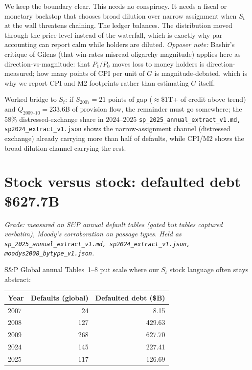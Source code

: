We keep the boundary clear. This needs no conspiracy. It needs a fiscal or monetary backstop that chooses broad dilution over narrow assignment when $S_t$ at the wall threatens chaining. The ledger balances. The distribution moved through the price level instead of the waterfall, which is exactly why par accounting can report calm while holders are diluted. \textit{Opposer note:} Bashir's critique of Gilens (that win-rates misread oligarchy magnitude) applies here as direction-vs-magnitude: that $P_1/P_0$ moves loss to money holders is direction-measured; how many points of CPI per unit of $G$ is magnitude-debated, which is why we report CPI and M2 footprints rather than estimating $G$ itself.

Worked bridge to $S_t$: if $S_{2007}=21$ points of gap ($\approx\$1$T+ of credit above trend) and $Q_{2009\text{--}10}=233.6$B of provision flow, the remainder must go somewhere; the $58\%$ distressed-exchange share in $2024$--$2025$ \texttt{sp\_2025\_annual\_extract\_v1.md, sp2024\_extract\_v1.json} shows the narrow-assignment channel (distressed exchange) already carrying more than half of defaults, while CPI/M2 shows the broad-dilution channel carrying the rest.

\section{Stock versus stock: defaulted debt \$627.7B}
\label{sec:defaulted-debt}

\textit{Grade: measured on S\&P annual default tables (gated but tables captured verbatim), Moody's corroboration on passage types. Held as \texttt{sp\_2025\_annual\_extract\_v1.md, sp2024\_extract\_v1.json, moodys2008\_bytype\_v1.json}.}

S\&P Global annual Tables~1--8 put scale where our $S_t$ stock language often stays abstract:

\begin{center}
\small
\begin{tabular}{lrr}
\toprule
Year & Defaults (global) & Defaulted debt (\$B) \\
\midrule
2007 & 24 & 8.15 \\
2008 & 127 & 429.63 \\
2009 & 268 & 627.70 \\
2024 & 145 & 227.41 \\
2025 & 117 & 126.69 \\
\bottomrule
\end{tabular}
\end{center}

